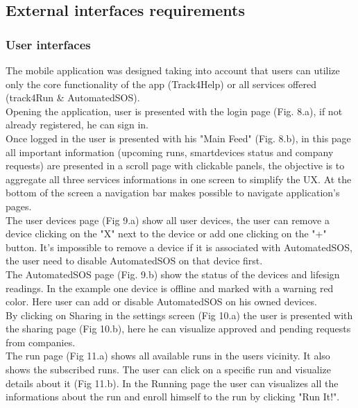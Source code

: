 \documentclass[../main.tex]{subfiles}
\begin{document}
\subsection{External interfaces requirements}

\subsubsection{User interfaces}

The mobile application was designed taking into account that users can utilize only the core functionality of the app (Track4Help) or all services offered (track4Run \& AutomatedSOS).\\
Opening the application, user is presented with the login page (Fig. 8.a), if not already registered, he can sign in.\\
 Once logged in the user is presented with his "Main Feed" (Fig. 8.b), in this page all important information (upcoming runs, smartdevices status and company requests) are presented in a scroll page with clickable panels,
  the objective is to aggregate all three services informations in one screen to simplify the UX.
 At the bottom of the screen a navigation bar makes possible to navigate application's pages.\\
 The user devices page (Fig 9.a) show all user devices, the user can remove a device clicking on the "X" next to the device or add one clicking on the "+" button.
 It's impossible to remove a device if it is associated with AutomatedSOS, the user need to disable AutomatedSOS on that device first.\\
 The AutomatedSOS page (Fig. 9.b) show the status of the devices and lifesign readings. In the example one device is offline and marked with a warning red color.
 Here user can add or disable AutomatedSOS on his owned devices.\\
By clicking on Sharing in the settings screen (Fig 10.a) the user is presented with the sharing page (Fig 10.b), here he can visualize approved and pending requests from companies.\\
 The run page (Fig 11.a) shows all available runs in the users vicinity. It also shows the subscribed runs. The user can click on a specific run and visualize details about it (Fig 11.b).
 In the Running page the user can visualizes all the informations about the run and enroll himself to the run by clicking "Run It!".
\end{document}
